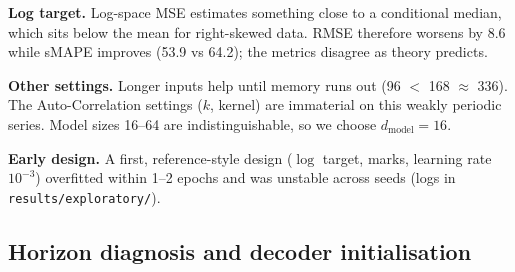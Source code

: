 \documentclass[11pt,a4paper]{article}
\begin{document}
\noindent\textbf{Log target.} Log-space MSE estimates something close to a conditional median, which sits below the mean for right-skewed data. RMSE therefore worsens by 8.6 while sMAPE improves (53.9 vs 64.2); the metrics disagree as theory predicts.

\noindent\textbf{Other settings.} Longer inputs help until memory runs out (96 $<$ 168 $\approx$ 336). The Auto-Correlation settings ($k$, kernel) are immaterial on this weakly periodic series. Model sizes 16--64 are indistinguishable, so we choose $d_{\text{model}}=16$.

\noindent\textbf{Early design.} A first, reference-style design ($\log$ target, marks, learning rate $10^{-3}$) overfitted within 1--2 epochs and was unstable across seeds (logs in \texttt{results/\allowbreak exploratory/}).

\subsection{Horizon diagnosis and decoder initialisation}\label{sec:hor}
\begin{table}[htbp]\centering\small
\caption{Validation block RMSE and pooled RMSE at selected horizon steps (5 seeds unless noted). Persistence: 19.4 / 57.8 / 107.6 / 136.0 at steps 1 / 6 / 24 / 168.}
\label{tab:hor}
\end{table}
\end{document}
